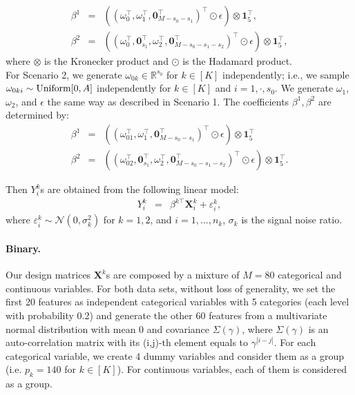 \documentclass[11pt]{article}
\theoremstyle{plain}
\theoremstyle{definition}
\theoremstyle{remark}
\newcommand{\X}{\mathbf{X}}
\newcommand{\0}{\mathbf{0}}
\begin{document}
\begin{eqnarray*}
\beta^1&=&((\omega_0^\top , \omega_1^\top, \mathbf{0}_{M-s_0-s_1}^\top)^\top  \odot \epsilon ) \otimes \mathbf{1}_5^\top,\\
\beta^2&=&((\omega_0^\top, \mathbf{0}_{s_1}^\top,\omega_2^\top, \mathbf{0}_{M-s_0-s_1-s_2}^\top)^\top \odot \epsilon ) \otimes \mathbf{1}_5^\top, 
\end{eqnarray*}
where $\otimes$ is the Kronecker product and $\odot$ is the Hadamard product.\\

For Scenario 2, we generate $\omega_{0k} \in \mathbb{R}^{s_0}$ for $k\in [K]$ independently; i.e., we sample $\omega_{0ki} \sim \textnormal{Uniform}[0,A]$ independently for $k \in [K]$ and $i=1,\cdot, s_0$. We generate $\omega_{1}$, $\omega_2$, and $\epsilon$ the same way as described in Scenario 1. The coefficients $\beta^1, \beta^2$ are determined by:
\begin{eqnarray*}
\beta^1&=&((\omega_{01}^\top, \omega_1^\top, \mathbf{0}_{M-s_0-s_1}^\top)^\top\odot \epsilon) \otimes \mathbf{1}_5^\top\\
\beta^2&=&((\omega_{02}^\top, \mathbf{0}_{s_1}^\top,\omega_2^\top, \mathbf{0}_{M-s_0-s_1-s_2}^\top)^\top\odot \epsilon)\otimes \mathbf{1}_5^\top.
\end{eqnarray*}


Then $Y_i^k$s are obtained from the following linear model:
\begin{eqnarray*}\label{eqn:linmod}
Y^k_{i}&=&\beta^{k\top}\X^k_{i}+\varepsilon^k_{i},
\end{eqnarray*}
where $\varepsilon_i^k\sim \mathcal{N}(0,\sigma_k^2)$ for $k=1,2$, and $i=1,\dots,n_k$, $\sigma_k$ is the signal noise ratio. %


\paragraph{Binary.} Our design matrices $\X^k$s are composed by a mixture of $M=80$ categorical and continuous variables. For both data sets, without loss of generality, we set the first 20 features as independent categorical variables with 5 categories (each level with probability 0.2) and generate the other 60 features from a multivariate normal distribution with mean 0 and covariance $\Sigma(\gamma)$, where $\Sigma(\gamma)$ is an auto-correlation matrix with its (i,j)-th element equals to $\gamma^{|i-j|}$. For each categorical variable, we create 4 dummy variables and consider them as a group (i.e. $p_k = 140$ for $k \in [K]$). For continuous variables, each of them is considered as a group.
\end{document}
